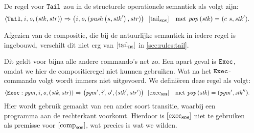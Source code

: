 De regel voor $\texttt{Tail}$ zou in de structurele operationele semantiek als volgt
zijn:
$$
	\left\langle\texttt{Tail},\mathit{i},\mathit{o},(\mathit{stk},\mathit{str})\right\rangle\Rightarrow\left(\mathit{i},\mathit{o},(\mathit{push}\left(s, \mathit{stk}'\right), \mathit{str})\right)
	\enspace[\mbox{tail}_{\mbox{\footnotesize{sos}}}]
	\quad\text{met $\mathit{pop}\left(\mathit{stk}\right) = (c~s,\mathit{stk}')$.}
$$

Afgezien van de compositie, die bij de natuurlijke semantiek in iedere regel is
ingebouwd, verschilt dit niet erg van $[\mbox{tail}_{\mbox{\footnotesize{ns}}}]$ in \autoref{sec:rules:tail}.

Dit geldt voor bijna alle andere commando's net zo. Een apart geval is
$\texttt{Exec}$, omdat we hier de compositieregel niet kunnen gebruiken. Wat na het
$\texttt{Exec}$-commando volgt wordt immers niet uitgevoerd. We definiëren deze
regel als volgt:
$$
	\left\langle\texttt{Exec}:\mathit{pgm},\mathit{i},\mathit{o},(\mathit{stk},\mathit{str})\right\rangle\Rightarrow\left(\mathit{pgm}',\mathit{i}',\mathit{o}',(\mathit{stk}',\mathit{str}')\right)
	\enspace[\mbox{exec}_{\mbox{\footnotesize{sos}}}]
	\quad\text{met $\mathit{pop}\left(\mathit{stk}\right) = ( \mathit{pgm}', \mathit{stk}'')$.}
$$
Hier wordt gebruik gemaakt van een ander soort transitie, waarbij een programma
aan de rechterkant voorkomt. Hierdoor is $[\mbox{exec}_{\mbox{\footnotesize{sos}}}]$ niet te gebruiken als
premisse voor $[\mbox{comp}_{\mbox{\footnotesize{sos}}}]$, wat precies is wat we wilden.
